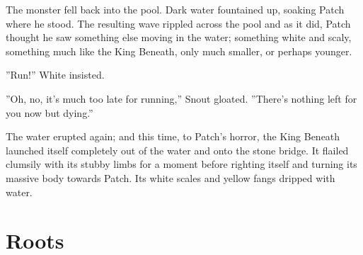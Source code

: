 \documentclass[12pt]{book}
\begin{document}
The monster fell back into the pool. Dark water fountained up, soaking Patch where he stood. The resulting wave rippled across the pool %
 and as it did, Patch thought he saw something else moving in the water; something white and scaly, something much like the King Beneath, only much smaller, or perhaps younger.\par
 ''Run!'' White insisted.\par
 ''Oh, no, it's much too late for running,'' Snout gloated. ''There's nothing left for you now but dying.''\par
 The water erupted again; and this time, to Patch's horror, the King Beneath launched itself completely out of the water and onto the stone bridge. It flailed clumsily with its stubby limbs for a moment before righting itself and turning its massive body towards Patch. Its white scales and yellow fangs dripped with water.\par

\section{Roots}
\end{document}
